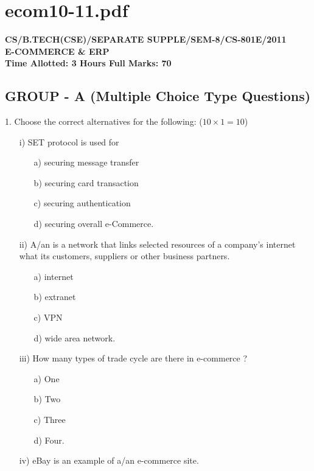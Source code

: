 \documentclass{article}
\begin{document}
\newpage
\section*{ecom10-11.pdf}
\textbf{CS/B.TECH(CSE)/SEPARATE SUPPLE/SEM-8/CS-801E/2011} \\
\textbf{E-COMMERCE \& ERP} \\
\textbf{Time Allotted: 3 Hours \hfill Full Marks: 70}

\subsection*{GROUP - A (Multiple Choice Type Questions)}
1. Choose the correct alternatives for the following: ($10 \times 1 = 10$)
\begin{enumerate}
    \item[i)] SET protocol is used for
    \begin{enumerate}
        \item[a)] securing message transfer
        \item[b)] securing card transaction
        \item[c)] securing authentication
        \item[d)] securing overall e-Commerce.
    \end{enumerate}
    \item[ii)] A/an \underline{\hspace{2cm}} is a network that links selected resources of a company's internet what its customers, suppliers or other business partners.
    \begin{enumerate}
        \item[a)] internet
        \item[b)] extranet
        \item[c)] VPN
        \item[d)] wide area network.
    \end{enumerate}
    \item[iii)] How many types of trade cycle are there in e-commerce ?
    \begin{enumerate}
        \item[a)] One
        \item[b)] Two
        \item[c)] Three
        \item[d)] Four.
    \end{enumerate}
    \item[iv)] eBay is an example of a/an \underline{\hspace{2cm}} e-commerce site.

\end{enumerate}
\end{document}
